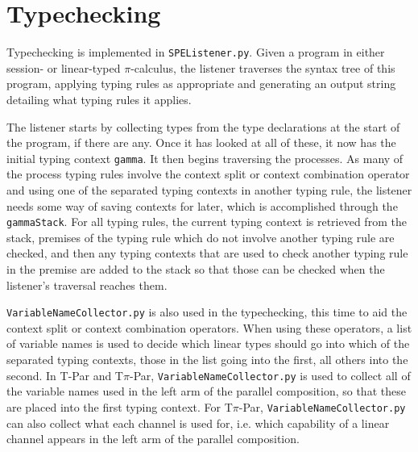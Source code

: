 \documentclass{l4proj}
\begin{document}
\newpage

\section{Typechecking}
\label{implTCh}

\quad Typechecking is implemented in \texttt{SPEListener.py}. Given a program in either session- or linear-typed $\pi$-calculus, the listener traverses the syntax tree of this program, applying typing rules as appropriate and generating an output string detailing what typing rules it applies.

\quad The listener starts by collecting types from the type declarations at the start of the program, if there are any. Once it has looked at all of these, it now has the initial typing context \texttt{gamma}. It then begins traversing the processes. As many of the process typing rules involve the context split or context combination operator and using one of the separated typing contexts in another typing rule, the listener needs some way of saving contexts for later, which is accomplished through the \texttt{gammaStack}. For all typing rules, the current typing context is retrieved from the stack, premises of the typing rule which do not involve another typing rule are checked, and then any typing contexts that are used to check another typing rule in the premise are added to the stack so that those can be checked when the listener's traversal reaches them.

\quad \texttt{VariableNameCollector.py} is also used in the typechecking, this time to aid the context split or context combination operators. When using these operators, a list of variable names is used to decide which linear types should go into which of the separated typing contexts, those in the list going into the first, all others into the second. In T-Par and T$\pi$-Par, \texttt{VariableNameCollector.py} is used to collect all of the variable names used in the left arm of the parallel composition, so that these are placed into the first typing context. For T$\pi$-Par, \texttt{VariableNameCollector.py} can also collect what each channel is used for, i.e. which capability of a linear channel appears in the left arm of the parallel composition.
\end{document}
